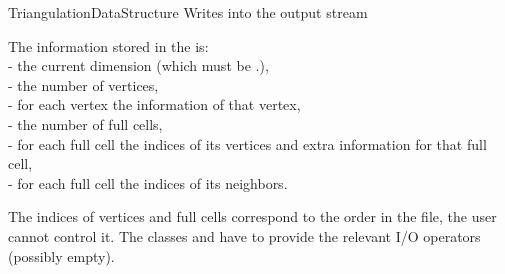 \begin{ccRefConcept}{TriangulationDataStructure}
{Writes  into the output stream }

The information stored in the  is:
\\- the current dimension (which must be \ccc{<=}\ccVar.), 
\\- the number of vertices,
\\- for each vertex the information of that vertex,
\\- the number of full cells, 
\\- for each full cell the indices of its vertices and extra information for that full cell,
\\- for each full cell the indices of its neighbors.

The indices of vertices and full cells correspond to the order in the
file, the user cannot control it.
The classes  and
 have to provide the relevant I/O operators
(possibly empty).


\ccSeeAlso

\\
\\
\\

\end{ccRefConcept}
